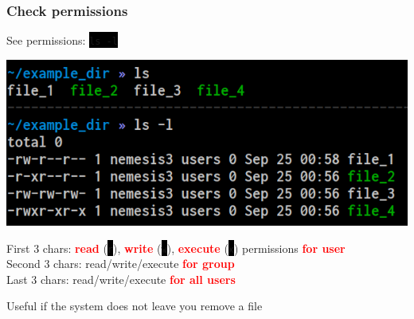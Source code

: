 \documentclass[unknownkeysallowed, 10pt, a4 paper, handout]{beamer}
\newcommand{\focus}[1]{\textbf{\textcolor{red}{#1}}}
\newcommand{\code}[1]{\colorbox{black}{\color{green}\texttt{#1}}}
\newcommand{\sidebyside}[5]{
  \begin{minipage}{#1\textwidth}
    #2
  \end{minipage} #3 \begin{minipage}{#4\textwidth}
    #5
  \end{minipage}
}
\begin{document}
\begin{frame}
  \begin{center}
    \frametitle{Check permissions}

    \sidebyside{0.44}{
      \centering
      See permissions: \code{ls -l}
    }{\hfill}{0.52}{
      \begin{center}
        \includegraphics[width=1.00\textwidth]{pics/ls-l.png}
      \end{center}
    }

    First 3 chars: \focus{read} (\code{r}), \focus{write} (\code{w}), \focus{execute} (\code{x}) permissions \focus{for user}\\
    Second 3 chars: read/write/execute \focus{for group}\\
    Last 3 chars: read/write/execute \focus{for all users}

    Useful if the system does not leave you remove a file
  \end{center}
\end{frame}
\end{document}
